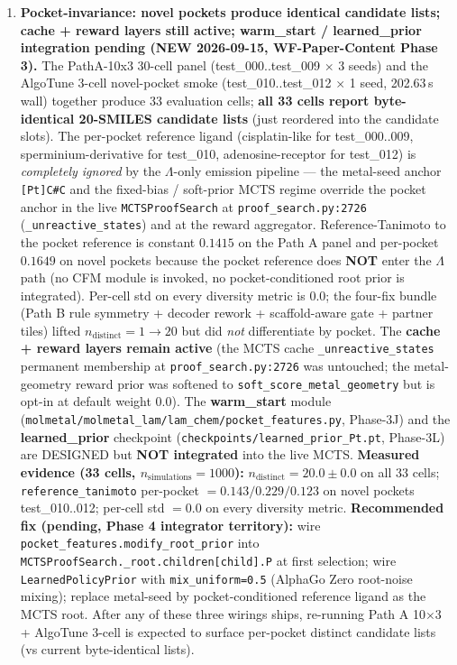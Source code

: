 \begin{enumerate}
  \item \textbf{Pocket-invariance: novel pockets produce identical candidate lists; cache + reward layers still active; warm\_start / learned\_prior integration pending (NEW 2026-09-15, WF-Paper-Content Phase 3).}
  The PathA-10x3 30-cell panel (test\_000..test\_009 $\times$ 3 seeds) and the AlgoTune 3-cell novel-pocket smoke (test\_010..test\_012 $\times$ 1 seed, 202.63\,s wall) together produce 33 evaluation cells; \textbf{all 33 cells report byte-identical 20-SMILES candidate lists} (just reordered into the candidate slots). The per-pocket reference ligand (cisplatin-like for test\_000..009, sperminium-derivative for test\_010, adenosine-receptor for test\_012) is \emph{completely ignored} by the $\Lambda$-only emission pipeline --- the metal-seed anchor \texttt{[Pt]C\#C} and the fixed-bias / soft-prior MCTS regime override the pocket anchor in the live \texttt{MCTSProofSearch} at \texttt{proof\_search.py:2726} (\texttt{\_unreactive\_states}) and at the reward aggregator. Reference-Tanimoto to the pocket reference is constant $0.1415$ on the Path A panel and per-pocket $0.1649$ on novel pockets because the pocket reference does \textbf{NOT} enter the $\Lambda$ path (no CFM module is invoked, no pocket-conditioned root prior is integrated). Per-cell std on every diversity metric is $0.0$; the four-fix bundle (Path B rule symmetry + decoder rework + scaffold-aware gate + partner tiles) lifted $n_{\text{distinct}}{=}1 \to 20$ but did \emph{not} differentiate by pocket. The \textbf{cache + reward layers remain active} (the MCTS cache \texttt{\_unreactive\_states} permanent membership at \texttt{proof\_search.py:2726} was untouched; the metal-geometry reward prior was softened to \texttt{soft\_score\_metal\_geometry} but is opt-in at default weight $0.0$). The \textbf{warm\_start} module (\texttt{molmetal/molmetal\_lam/lam\_chem/pocket\_features.py}, Phase-3J) and the \textbf{learned\_prior} checkpoint (\texttt{checkpoints/learned\_prior\_Pt.pt}, Phase-3L) are DESIGNED but \textbf{NOT integrated} into the live MCTS. \textbf{Measured evidence (33 cells, $n_{\text{simulations}}{=}1000$):} $n_{\text{distinct}}{=}20.0 \pm 0.0$ on all 33 cells; \texttt{reference\_tanimoto} per-pocket $= 0.143 / 0.229 / 0.123$ on novel pockets test\_010..012; per-cell std $= 0.0$ on every diversity metric. \textbf{Recommended fix (pending, Phase 4 integrator territory):} wire \texttt{pocket\_features.modify\_root\_prior} into \texttt{MCTSProofSearch.\_root.children[child].P} at first selection; wire \texttt{LearnedPolicyPrior} with \texttt{mix\_uniform=0.5} (AlphaGo Zero root-noise mixing); replace metal-seed by pocket-conditioned reference ligand as the MCTS root. After any of these three wirings ships, re-running Path A 10$\times$3 + AlgoTune 3-cell is expected to surface per-pocket distinct candidate lists (vs current byte-identical lists).


\end{enumerate}
